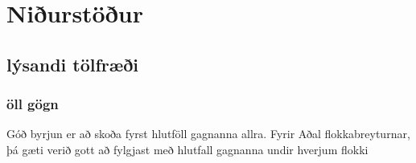 \documentclass[
  12pt,
]{article}
\begin{document}
\hypertarget{niuxf0urstuxf6uxf0ur}{%
\section{Niðurstöður}\label{niuxf0urstuxf6uxf0ur}}

\hypertarget{luxfdsandi-tuxf6lfruxe6uxf0i}{%
\subsection{lýsandi tölfræði}\label{luxfdsandi-tuxf6lfruxe6uxf0i}}

\hypertarget{uxf6ll-guxf6gn}{%
\subsubsection{öll gögn}\label{uxf6ll-guxf6gn}}

Góð byrjun er að skoða fyrst hlutföll gagnanna allra. Fyrir Aðal flokkabreyturnar, þá gæti verið gott að fylgjast með hlutfall gagnanna undir hverjum flokki
\end{document}
